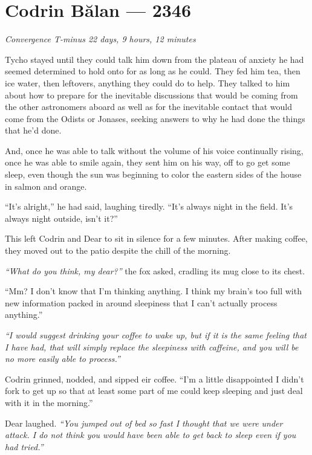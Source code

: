 \hypertarget{codrin-bux103lan-2346}{%
\chapter{Codrin Bălan — 2346}\label{codrin-bux103lan-2346}}

\begin{center}
\emph{Convergence T-minus 22 days, 9 hours, 12 minutes}
\end{center}

\noindent Tycho stayed until they could talk him down from the plateau of anxiety he had seemed determined to hold onto for as long as he could. They fed him tea, then ice water, then leftovers, anything they could do to help. They talked to him about how to prepare for the inevitable discussions that would be coming from the other astronomers aboard as well as for the inevitable contact that would come from the Odists or Jonases, seeking answers to why he had done the things that he'd done.

And, once he was able to talk without the volume of his voice continually rising, once he was able to smile again, they sent him on his way, off to go get some sleep, even though the sun was beginning to color the eastern sides of the house in salmon and orange.

``It's alright,'' he had said, laughing tiredly. ``It's always night in the field. It's always night outside, isn't it?''

This left Codrin and Dear to sit in silence for a few minutes. After making coffee, they moved out to the patio despite the chill of the morning.

\emph{``What do you think, my dear?''} the fox asked, cradling its mug close to its chest.

``Mm? I don't know that I'm thinking anything. I think my brain's too full with new information packed in around sleepiness that I can't actually process anything.''

\emph{``I would suggest drinking your coffee to wake up, but if it is the same feeling that I have had, that will simply replace the sleepiness with caffeine, and you will be no more easily able to process.''}

Codrin grinned, nodded, and sipped eir coffee. ``I'm a little disappointed I didn't fork to get up so that at least some part of me could keep sleeping and just deal with it in the morning.''

Dear laughed. \emph{``You jumped out of bed so fast I thought that we were under attack. I do not think you would have been able to get back to sleep even if you had tried.''}

